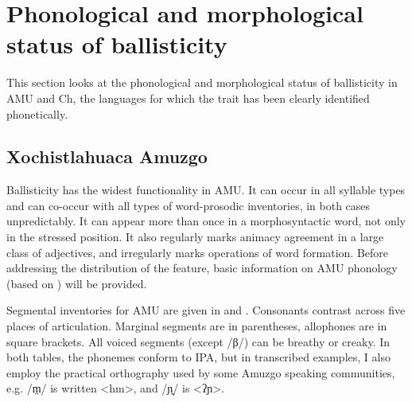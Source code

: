 \documentclass[output=paper]{langscibook}
\begin{document}
\section{Phonological and morphological status of ballisticity}\label{sec:dobui:3}
\label{bkm:Ref124173421}
This section looks at the phonological and morphological status of ballisticity in AMU and Ch, the languages for which the trait has been clearly identified phonetically. 

\subsection{Xochistlahuaca Amuzgo}\label{sec:dobui:3.1}
\label{bkm:Ref102915118}
Ballisticity has the widest functionality in AMU. It can occur in all syllable types and can co-occur with all types of word-prosodic inventories, in both cases unpredictably. It can appear more than once in a morphosyntactic word, not only in the stressed position. It also regularly marks animacy agreement in a large class of adjectives, and irregularly marks operations of word formation. Before addressing the distribution of the feature, basic information on AMU phonology (based on \citealt{Dobui2018}) will be provided.

Segmental inventories for AMU are given in  and . Consonants contrast across five places of articulation. Marginal segments are in parentheses, allophones are in square brackets. All voiced segments (except /β/) can be breathy or creaky. In both tables, the phonemes conform to IPA, but in transcribed examples, I also employ the practical orthography used by some Amuzgo speaking communities, e.g. /m̤/ is written <hm>, and /ɲ̰/ is <ʔɲ>.


\begin{table}
\caption{Consonant inventory of AMU}
\label{tab:dobui:1}
\end{table}
\end{document}
